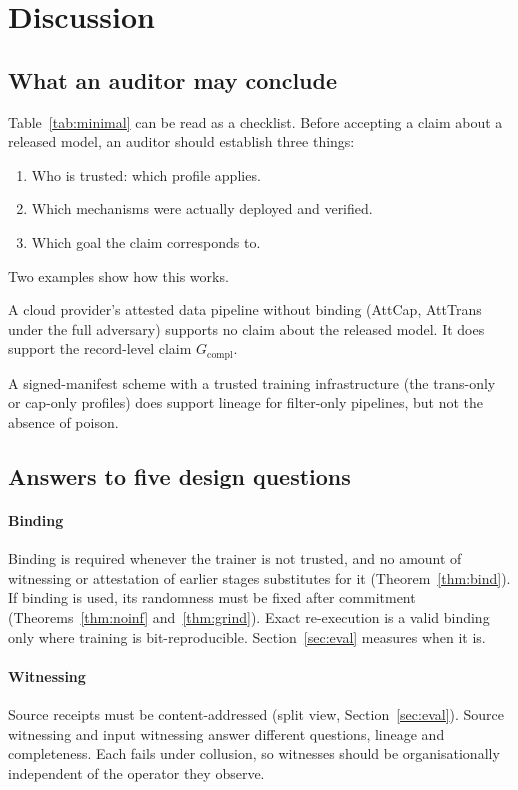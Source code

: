 \section{Discussion}\label{sec:discussion}

\subsection{What an auditor may conclude}

Table~\ref{tab:minimal} can be read as a checklist. Before accepting a claim about a
released model, an auditor should establish three things:
\begin{enumerate}
\item Who is trusted: which profile applies.
\item Which mechanisms were actually deployed and verified.
\item Which goal the claim corresponds to.
\end{enumerate}
Two examples show how this works.

A cloud provider's attested data pipeline without binding (\textsf{AttCap}, \textsf{AttTrans}
under the full adversary) supports no claim about the released model. It does support the
record-level claim $G_{\mathrm{compl}}$.

A signed-manifest scheme with a trusted training infrastructure (the trans-only or cap-only
profiles) does support lineage for filter-only pipelines, but not the absence of poison.

\subsection{Answers to five design questions}

\paragraph{Binding}
Binding is required whenever the trainer is not trusted, and no amount of witnessing or
attestation of earlier stages substitutes for it (Theorem~\ref{thm:bind}). If binding is
used, its randomness must be fixed after commitment (Theorems~\ref{thm:noinf}
and~\ref{thm:grind}). Exact re-execution is a valid binding only where training is
bit-reproducible. Section~\ref{sec:eval} measures when it is.

\paragraph{Witnessing}
Source receipts must be content-addressed (split view, Section~\ref{sec:eval}). Source
witnessing and input witnessing answer different questions, lineage and completeness. Each
fails under collusion, so witnesses should be organisationally independent of the operator
they observe.

